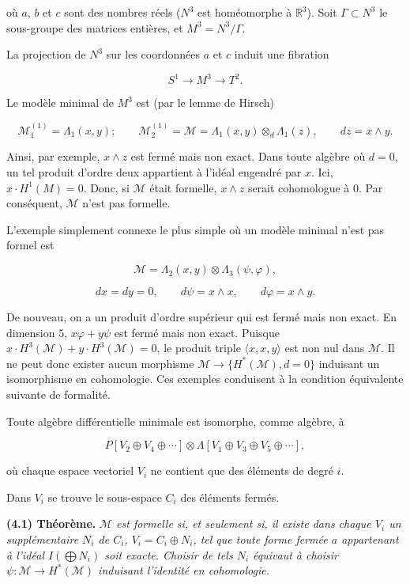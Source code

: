 \documentclass[
  french,
  a3paper,
  a3paper]{extarticle}
\begin{document}
où \(a\), \(b\) et \(c\) sont des nombres réels (\(N^3\) est homéomorphe
à \(\mathbb R^3\)). Soit \(\Gamma\subset N^3\) le sous-groupe des
matrices entières, et \(M^3=N^3/\Gamma\).

La projection de \(N^3\) sur les coordonnées \(a\) et \(c\) induit une
fibration

\[S^1\longrightarrow M^3\longrightarrow T^2.\]

Le modèle minimal de \(M^3\) est (par le lemme de Hirsch)

\[\mathcal M_1^{(1)}=\Lambda_1(x,y);\qquad\mathcal M_2^{(1)}=\mathcal M=\Lambda_1(x,y)\otimes_d\Lambda_1(z),\qquad dz=x\wedge y.\]

Ainsi, par exemple, \(x\wedge z\) est fermé mais non exact. Dans toute
algèbre où \(d=0\), un tel produit d'ordre deux appartient à l'idéal
engendré par \(x\). Ici, \(x\cdot H^1(M)=0\). Donc, si \(\mathcal M\)
était formelle, \(x\wedge z\) serait cohomologue à \(0\). Par
conséquent, \(\mathcal M\) n'est pas formelle.

L'exemple simplement connexe le plus simple où un modèle minimal n'est
pas formel est

\[\mathcal M=\Lambda_2(x,y)\otimes\Lambda_3(\psi,\varphi),\]

\[dx=dy=0,\qquad d\psi=x\wedge x,\qquad d\varphi=x\wedge y.\]

De nouveau, on a un produit d'ordre supérieur qui est fermé mais non
exact. En dimension \(5\), \(x\varphi+y\psi\) est fermé mais non exact.
Puisque \(x\cdot H^3(\mathcal M)+y\cdot H^3(\mathcal M)=0\), le produit
triple \(\langle x,x,y\rangle\) est non nul dans \(\mathcal M\). Il ne
peut donc exister aucun morphisme
\(\mathcal M\longrightarrow\{H^*(\mathcal M),d=0\}\) induisant un
isomorphisme en cohomologie. Ces exemples conduisent à la condition
équivalente suivante de formalité.

Toute algèbre différentielle minimale est isomorphe, comme algèbre, à

\[P[V_2\oplus V_4\oplus\cdots]\otimes\Lambda[V_1\oplus V_3\oplus V_5\oplus\cdots],\]

où chaque espace vectoriel \(V_i\) ne contient que des éléments de degré
\(i\).

Dans \(V_i\) se trouve le sous-espace \(C_i\) des éléments fermés.

\textbf{(4.1) Théorème.} \emph{\(\mathcal M\) est formelle si, et
seulement si, il existe dans chaque \(V_i\) un supplémentaire \(N_i\) de
\(C_i\), \(V_i=C_i\oplus N_i\), tel que toute forme fermée \(a\)
appartenant à l'idéal \(I(\bigoplus N_i)\) soit exacte. Choisir de tels
\(N_i\) équivaut à choisir
\(\psi:\mathcal M\longrightarrow H^*(\mathcal M)\) induisant l'identité
en cohomologie.}
\end{document}
